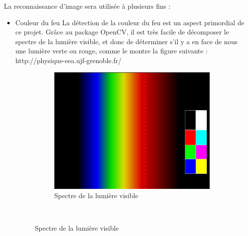 			La reconnaissance d'image sera utilisée à plusieurs fins :
			\begin{itemize}
				\item Couleur du feu
					La détection de la couleur du feu est un aspect primordial de ce projet. Grâce au package OpenCV, il est très facile de décomposer le spectre de la lumière visible, et donc de déterminer s'il y a en face de nous une lumière verte ou rouge, comme le montre la figure suivante :
					http://physique-eea.ujf-grenoble.fr/
					\begin{figure}
					    \centering
					    \begin{subfigure}[b]{0.5\textwidth}
					        \includegraphics[width=\textwidth]{Graphics/opencvEtalon.jpg}
					        \caption{Spectre de la lumière visible}
					    \end{subfigure}\\


\end{figure}
\end{itemize}
